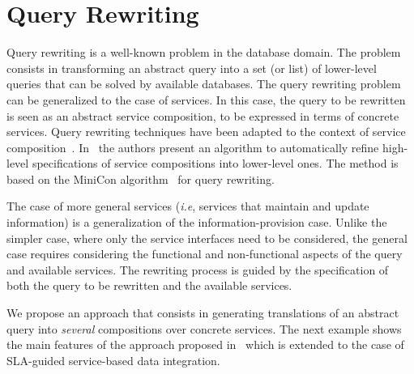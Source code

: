 \section{Query Rewriting}
\label{sec:queryRew}

  
 
Query rewriting is a well-known problem in the database domain.
The problem consists in transforming an abstract query into a set (or list) of lower-level queries that can be solved by  available databases.
The query rewriting problem can be generalized to the case of services.
In this case, the query to be rewritten is seen as an abstract service composition, to be expressed in terms of concrete services.
Query rewriting techniques have been adapted to the context of service composition~\cite{BBM10,ZLC11,CostaAMR13}. 
In~\cite{CostaAMR13} the authors present an algorithm to automatically refine high-level specifications of service compositions into lower-level ones. 
The method is based on the MiniCon algorithm~\cite{PH01} for query rewriting.

The case of more general services (\textit{i.e}, services that maintain and update information) is a generalization of the information-provision case.
Unlike the simpler case, where only the service interfaces need to be considered, the general case requires considering the functional and non-functional aspects of the query and available services.
The rewriting process is guided by the specification of both the query to be rewritten and the available services.


We propose an approach that consists in generating translations of an abstract query into \textit{several}  compositions over concrete  services. 
The next example shows the main features of the approach proposed in~\cite{CostaAMR13} which is extended to the case of SLA-guided service-based data integration. 

